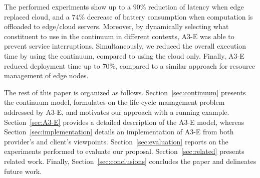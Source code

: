 The performed experiments show up to a $90$\% reduction of latency when edge replaced cloud, and a $74$\% decrease of battery consumption when computation is offloaded 
to edge/cloud servers. Moreover, by dynamically selecting what constituent to use in the continuum in different contexts, 
A3-E was able to prevent service interruptions. Simultaneously, we reduced the overall execution time by using the continuum, compared to using the cloud only. Finally, A3-E reduced deployment time up to 70\%, compared to a similar approach for resource management of edge nodes.











The rest of this paper is organized as follows. Section~\ref{sec:continuum} presents the continuum model, formulates on the life-cycle management problem addressed by A3-E, and motivates our approach with a running example.
Section~\ref{sec:A3-E} provides a detailed description of the A3-E model, whereas Section~\ref{sec:implementation} details an implementation of A3-E from both provider's and client's viewpoints. Section~\ref{sec:evaluation} reports on the experiments performed to evaluate our proposal. Section~\ref{sec:related} presents related work. Finally, Section~\ref{sec:conclusions} concludes the paper and delineates future work.

